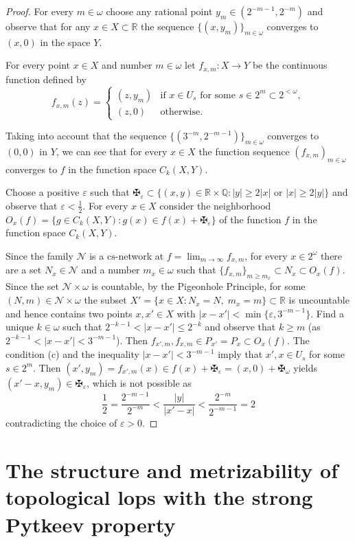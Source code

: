 \documentclass{amsart}
\theoremstyle{definition}
\begin{document}
\begin{proof}
For every $m\in{\omega}$ choose any rational point $y_m\in (2^{-m-1},2^{-m})$ and observe that for any $x\in X\subset{\mathbb R}$ the sequence $\big\{(x,y_m)\big\}_{m\in{\omega}}$ converges to $(x,0)$ in the space $Y$.

For every point $x\in X$ and number $m\in{\omega}$ let $f_{x,m}:X\to Y$ be the continuous function defined by
$$f_{x,m}(z)=\begin{cases}
(z,y_m)&\mbox{if $x\in U_s$ for some $s\in 2^m\subset 2^{<{\omega}}$},\\
(z,0)&\mbox{otherwise}.
\end{cases}
$$

Taking into account that the sequence $\big\{(3^{-m},2^{-m-1})\}_{m\in{\omega}}$ converges to $(0,0)$ in $Y$, we can see that for every $x\in X$ the function sequence $(f_{x,m})_{m\in{\omega}}$ converges to $f$ in the function space $C_k(X,Y)$.

Choose a positive ${\varepsilon}$ such that  $\maltese_{\varepsilon}\subset\{(x,y)\in{\mathbb R}\times{\mathbb Q}: |y|\ge 2|x| \mbox{ or $|x|\ge 2|y|$}\}$ and observe that ${\varepsilon}<\frac12$.
For every $x\in X$ consider the neighborhood $O_x(f)=\{g\in C_k(X,Y):g(x)\in f(x)+\maltese_{\varepsilon}\}$ of the function $f$ in the function space $C_k(X,Y)$.

Since the family $\mathcal N$ is a ${\mathrm{cs}}$-network at $f=\lim_{m\to\infty}f_{x,m}$,
for every $x\in 2^{\omega}$ there are a set $N_x\in\mathcal N$ and a number $m_x\in{\omega}$ such that $\{f_{x,m}\}_{m\ge m_x}\subset N_x\subset O_x(f)$. Since the set $\mathcal N\times {\omega}$ is countable, by the Pigeonhole Principle,
for some $(N,m)\in\mathcal N\times {\omega}$ the subset $X'=\{x\in X: N_x=N,\;m_x=m\}\subset {\mathbb R}$ is uncountable and hence contains two points $x,x'\in X$ with $|x-x'|<\min\{{\varepsilon},3^{-m-1}\}$. Find a unique $k\in{\omega}$ such that $2^{-k-1}<|x-x'|\le 2^{-k}$ and observe that $k\ge m$ (as $2^{-k-1}<|x-x'|<3^{-m-1}$). Then $f_{x',m},f_{x,m}\in P_{x'}=P_x\subset O_{x}(f)$. The condition (c) and the inequality $|x-x'|<3^{-m-1}$ imply  that $x',x\in U_s$ for some $s\in 2^m$. Then $(x',y_m)=f_{x',m}(x)\in f(x)+\maltese_{\varepsilon}=(x,0)+\maltese_{\omega}$ yields $(x'-x,y_m)\in\maltese_{\varepsilon}$, which is not possible as
$$\frac12=\frac{2^{-m-1}}{2^{-m}}<\frac{|y|}{|x'-x|}<\frac{2^{-m}}{2^{-m-1}}=2$$contradicting the choice of ${\varepsilon}>0$.
\end{proof}

\section{The structure and metrizability of topological lops with the strong Pytkeev property}\label{s5}
\end{document}
